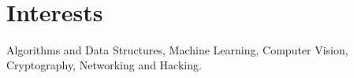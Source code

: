 \documentclass[a4paper,10pt]{extarticle} %
\begin{document}
  
  \hfill\\
  \vspace{-0.5cm}
  \section{\textcolor{primary}{Interests}}
  \begin{description}
  Algorithms and Data Structures, Machine Learning, Computer Vision, Cryptography, Networking and Hacking.
  \end{description}
  
  \hfill\\
 
  \vspace{-0.4cm}
\end{document}
